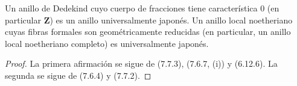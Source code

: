 \begin{corollary}[7.7.4]
\label{IV.2.s7.7.4-fr}
Un anillo de Dedekind cuyo cuerpo de fracciones tiene característica 0
(en particular $\mathbf Z$) es un anillo universalmente japonés.
Un anillo local noetheriano cuyas fibras formales son geométricamente
reducidas (en particular, un anillo local noetheriano completo) es
universalmente japonés.
\end{corollary}

\begin{proof}
La primera afirmación se sigue de (7.7.3), (7.6.7, (i)) y (6.12.6).
La segunda se sigue de (7.6.4) y (7.7.2).
\end{proof}
